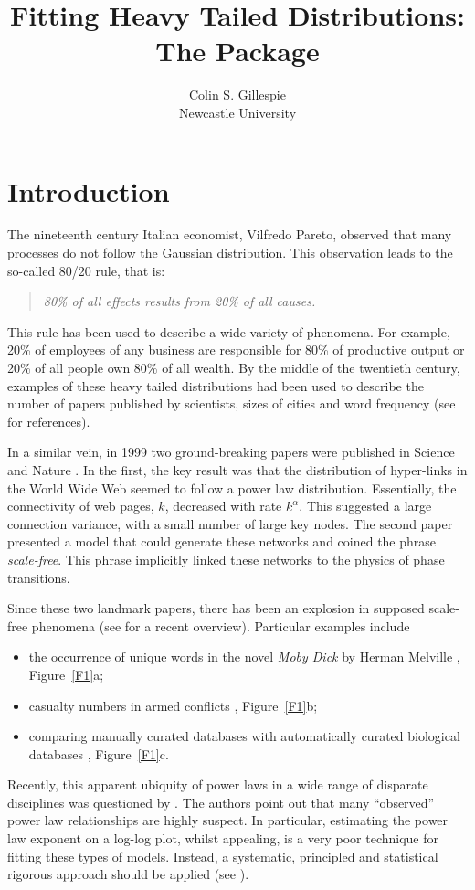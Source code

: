 \documentclass[article]{jss}
\author{Colin S. Gillespie\\Newcastle University}
\title{Fitting Heavy Tailed Distributions: The \pkg{poweRlaw} Package}
\begin{document}
\section{Introduction}\label{S1}

The nineteenth century Italian economist, Vilfredo Pareto, observed that many
processes do not follow the Gaussian distribution. This observation leads to the
so-called 80/20 rule, that is:
\begin{quote}
  \textit{80\% of all effects results from 20\% of all causes.}
\end{quote}
This rule has been used to describe a wide variety of phenomena. For
example, 20\% of employees of any business are responsible for 80\% of
productive output or 20\% of all people own 80\% of all wealth. By the
middle of the twentieth century, examples of these heavy tailed
distributions had been used to describe the number of papers published
by scientists, sizes of cities and word frequency (see
\citealt{Keller2005} for references).

In a similar vein, in 1999 two ground-breaking papers were published in
Science and Nature \citep{Barabasi1999,Albert1999}. In the first, the key result
was that the distribution of hyper-links in the World Wide Web seemed to follow
a power law distribution. Essentially, the connectivity of web pages, $k$,
decreased with rate $k^{\alpha}$. This suggested a large connection variance,
with a small number of large key nodes. The second paper presented a model that
could generate these networks and coined the phrase \textit{scale-free}. This
phrase implicitly linked these networks to the physics of phase transitions.

Since these two landmark papers, there has been an explosion in supposed
scale-free phenomena (see \cite{Clauset2009} for a recent overview). Particular
examples include
\begin{itemize}
\item the occurrence of unique words in the novel \textit{Moby Dick} by Herman
  Melville \citep{Newman2005}, Figure~\ref{F1}a;
\item casualty numbers in armed conflicts \citep{Bohorquez2009, Friedman2013}, Figure~\ref{F1}b;
\item comparing manually curated databases with automatically curated biological
  databases \citep{Bell2012}, Figure~\ref{F1}c.
\end{itemize}
Recently, this apparent ubiquity of power laws in a wide range of disparate
disciplines was questioned by \cite{Stumpf2012}. The authors point out that many
``observed'' power law relationships are highly suspect. In particular,
estimating the power law exponent on a log-log plot, whilst appealing, is a very
poor technique for fitting these types of models. Instead, a systematic,
principled and statistical rigorous approach should be applied (see
\citealt{Goldstein2004}).
\end{document}

